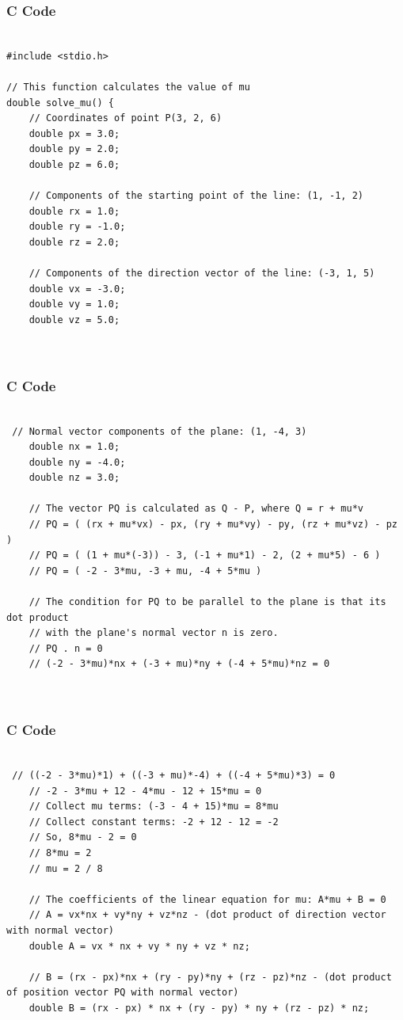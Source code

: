 \documentclass{beamer}
\begin{document}
\begin{frame}[fragile]
    \frametitle{C Code}
    \begin{lstlisting}

#include <stdio.h>

// This function calculates the value of mu
double solve_mu() {
    // Coordinates of point P(3, 2, 6)
    double px = 3.0;
    double py = 2.0;
    double pz = 6.0;

    // Components of the starting point of the line: (1, -1, 2)
    double rx = 1.0;
    double ry = -1.0;
    double rz = 2.0;

    // Components of the direction vector of the line: (-3, 1, 5)
    double vx = -3.0;
    double vy = 1.0;
    double vz = 5.0;

   

    \end{lstlisting}
\end{frame}

\begin{frame}[fragile]
    \frametitle{C Code}
    \begin{lstlisting}

 // Normal vector components of the plane: (1, -4, 3)
    double nx = 1.0;
    double ny = -4.0;
    double nz = 3.0;

    // The vector PQ is calculated as Q - P, where Q = r + mu*v
    // PQ = ( (rx + mu*vx) - px, (ry + mu*vy) - py, (rz + mu*vz) - pz )
    // PQ = ( (1 + mu*(-3)) - 3, (-1 + mu*1) - 2, (2 + mu*5) - 6 )
    // PQ = ( -2 - 3*mu, -3 + mu, -4 + 5*mu )

    // The condition for PQ to be parallel to the plane is that its dot product
    // with the plane's normal vector n is zero.
    // PQ . n = 0
    // (-2 - 3*mu)*nx + (-3 + mu)*ny + (-4 + 5*mu)*nz = 0
    
   

    \end{lstlisting}
\end{frame}

\begin{frame}[fragile]
    \frametitle{C Code}
    \begin{lstlisting}

 // ((-2 - 3*mu)*1) + ((-3 + mu)*-4) + ((-4 + 5*mu)*3) = 0
    // -2 - 3*mu + 12 - 4*mu - 12 + 15*mu = 0
    // Collect mu terms: (-3 - 4 + 15)*mu = 8*mu
    // Collect constant terms: -2 + 12 - 12 = -2
    // So, 8*mu - 2 = 0
    // 8*mu = 2
    // mu = 2 / 8
    
    // The coefficients of the linear equation for mu: A*mu + B = 0
    // A = vx*nx + vy*ny + vz*nz - (dot product of direction vector with normal vector)
    double A = vx * nx + vy * ny + vz * nz;
    
    // B = (rx - px)*nx + (ry - py)*ny + (rz - pz)*nz - (dot product of position vector PQ with normal vector)
    double B = (rx - px) * nx + (ry - py) * ny + (rz - pz) * nz;



    \end{lstlisting}
\end{frame}
\end{document}
